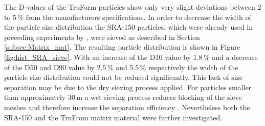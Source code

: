 The D-values of the TruForm particles show only very slight deviations between 2 to 5\,\% from the manufacturers specifications. In order to decrease the width of the particle size distribution the SRA-150 particles, which were already used in preceding experiments by \cite{AndreMaster}, were sieved as described in Section\,\ref{subsec:Matrix_mat}. The resulting particle distribution is shown in Figure\,\ref{fig:hist_SRA_sieve}. With an increase of the D10 value by 1.8\,\% and a decrease of the D50 and D90 value by 2.5\,\% and 5.5\,\%  respectively the width of the particle size distribution could not be reduced significantly. This lack of size separation may be due to the dry sieving process applied. For particles smaller than approximately 30\,\textmu m a wet sieving process reduces blocking of the sieve meshes and therefore increase the separation efficiency \cite{RetschSieve}. Nevertheless both the SRA-150 and the TruFrom matrix material were further investigated. 
  
